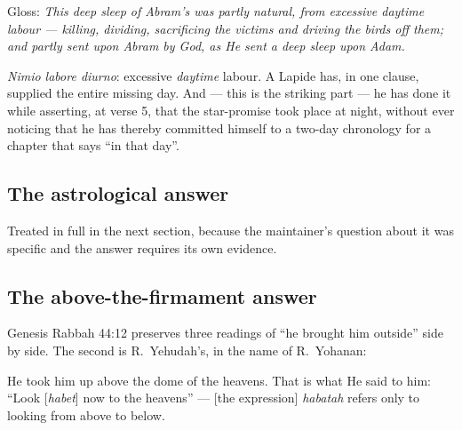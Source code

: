 \noindent Gloss: \emph{This deep sleep of Abram's was partly natural, from
excessive daytime labour --- killing, dividing, sacrificing the victims and
driving the birds off them; and partly sent upon Abram by God, as He sent a deep
sleep upon Adam.}

\textit{Nimio labore diurno}: excessive \emph{daytime} labour. A Lapide has, in
one clause, supplied the entire missing day. And --- this is the striking part
--- he has done it while asserting, at verse 5, that the star-promise took place
at night, without ever noticing that he has thereby committed himself to a
two-day chronology for a chapter that says ``in that day''.

\subsection{The astrological answer}

Treated in full in the next section, because the maintainer's question about it
was specific and the answer requires its own evidence.

\subsection{The above-the-firmament answer}

Genesis Rabbah 44:12 preserves three readings of ``he brought him outside'' side
by side. The second is R.~Yehudah's, in the name of R.~Yohanan:

\begin{studyframe}
He took him up above the dome of the heavens. That is what He said to him: ``Look
[\textit{habet}] now to the heavens'' --- [the expression] \textit{habatah}
refers only to looking from above to below.
\end{studyframe}

